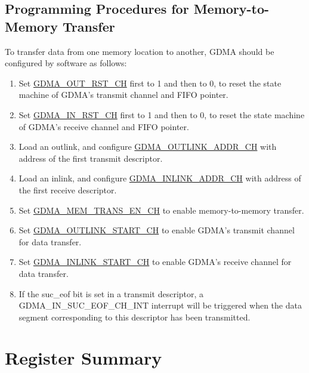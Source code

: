 \documentclass[main\_\_EN.tex]{subfiles}
\begin{document}
\subsection{Programming Procedures for Memory-to-Memory Transfer}
To transfer data from one memory location to another, GDMA should be configured by software as follows:
\begin{enumerate}
    \item Set \hyperref[fielddesc:GDMAOUTRSTCHN]{GDMA\_OUT\_RST\_CH} first to 1 and then to 0, to reset the state machine of GDMA's transmit channel and FIFO pointer.
    \item Set \hyperref[fielddesc:GDMAINRSTCHN]{GDMA\_IN\_RST\_CH} first to 1 and then to 0, to reset the state machine of GDMA's receive channel and FIFO pointer.
    \item Load an outlink, and configure \hyperref[fielddesc:GDMAOUTLINKADDRCHN]{GDMA\_OUTLINK\_ADDR\_CH} with address of the first transmit descriptor.
    \item Load an inlink, and configure \hyperref[fielddesc:GDMAINLINKADDRCHN]{GDMA\_INLINK\_ADDR\_CH} with address of the first receive descriptor.
    \item Set \hyperref[fielddesc:GDMAMEMTRANSENCHN]{GDMA\_MEM\_TRANS\_EN\_CH} to enable memory-to-memory transfer.
    \item Set \hyperref[fielddesc:GDMAOUTLINKSTARTCHN]{GDMA\_OUTLINK\_START\_CH} to enable GDMA's transmit channel for data transfer.
    \item Set \hyperref[fielddesc:GDMAINLINKSTARTCHN]{GDMA\_INLINK\_START\_CH} to enable GDMA's receive channel for data transfer.
    \item If the suc\_eof bit is set in a transmit descriptor, a GDMA\_IN\_SUC\_EOF\_CH\_INT interrupt will be triggered when the data segment corresponding to this descriptor has been transmitted.
\end{enumerate}





\clearpage
\hypertarget{dma-reg-summ}{}
\section{Register Summary}
\label{sec:dma-reg-summ}
\end{document}
